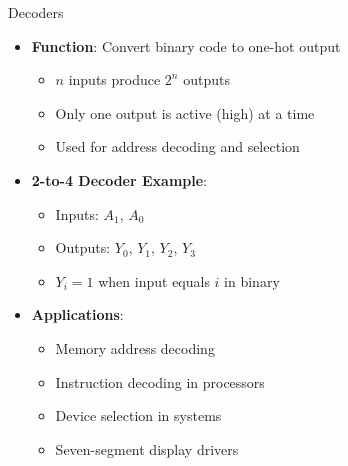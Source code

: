 \documentclass[aspectratio=169,11pt]{beamer}
\newcommand{\concept}[1]{\textbf{\color{accentcolor}#1}}
\begin{document}
\begin{frame}{Decoders}
\begin{itemize}
\item \concept{Function}: Convert binary code to one-hot output
\begin{itemize}
\item $n$ inputs produce $2^n$ outputs
\item Only one output is active (high) at a time
\item Used for address decoding and selection
\end{itemize}
\vspace{0.5cm}
\item \concept{2-to-4 Decoder Example}:
\begin{itemize}
\item Inputs: $A_1$, $A_0$
\item Outputs: $Y_0$, $Y_1$, $Y_2$, $Y_3$
\item $Y_i = 1$ when input equals $i$ in binary
\end{itemize}
\vspace{0.3cm}
\item \concept{Applications}:
\begin{itemize}
\item Memory address decoding
\item Instruction decoding in processors
\item Device selection in systems
\item Seven-segment display drivers
\end{itemize}
\end{itemize}
\end{frame}
\end{document}
